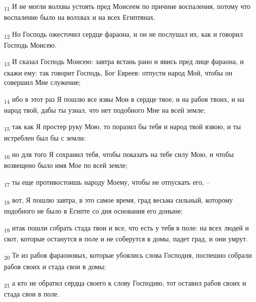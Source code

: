 \begin{tcolorbox}
\textsubscript{11} И не могли волхвы устоять пред Моисеем по причине воспаления, потому что воспаление было на волхвах и на всех Египтянах.
\end{tcolorbox}
\begin{tcolorbox}
\textsubscript{12} Но Господь ожесточил сердце фараона, и он не послушал их, как и говорил Господь Моисею.
\end{tcolorbox}
\begin{tcolorbox}
\textsubscript{13} И сказал Господь Моисею: завтра встань рано и явись пред лице фараона, и скажи ему: так говорит Господь, Бог Евреев: отпусти народ Мой, чтобы он совершил Мне служение;
\end{tcolorbox}
\begin{tcolorbox}
\textsubscript{14} ибо в этот раз Я пошлю все язвы Мои в сердце твое, и на рабов твоих, и на народ твой, дабы ты узнал, что нет подобного Мне на всей земле;
\end{tcolorbox}
\begin{tcolorbox}
\textsubscript{15} так как Я простер руку Мою, то поразил бы тебя и народ твой язвою, и ты истреблен был бы с земли:
\end{tcolorbox}
\begin{tcolorbox}
\textsubscript{16} но для того Я сохранил тебя, чтобы показать на тебе силу Мою, и чтобы возвещено было имя Мое по всей земле;
\end{tcolorbox}
\begin{tcolorbox}
\textsubscript{17} ты еще противостоишь народу Моему, чтобы не отпускать его, --
\end{tcolorbox}
\begin{tcolorbox}
\textsubscript{18} вот, Я пошлю завтра, в это самое время, град весьма сильный, которому подобного не было в Египте со дня основания его доныне;
\end{tcolorbox}
\begin{tcolorbox}
\textsubscript{19} итак пошли собрать стада твои и все, что есть у тебя в поле: на всех людей и скот, которые останутся в поле и не соберутся в домы, падет град, и они умрут.
\end{tcolorbox}
\begin{tcolorbox}
\textsubscript{20} Те из рабов фараоновых, которые убоялись слова Господня, поспешно собрали рабов своих и стада свои в домы;
\end{tcolorbox}
\begin{tcolorbox}
\textsubscript{21} а кто не обратил сердца своего к слову Господню, тот оставил рабов своих и стада свои в поле.
\end{tcolorbox}
